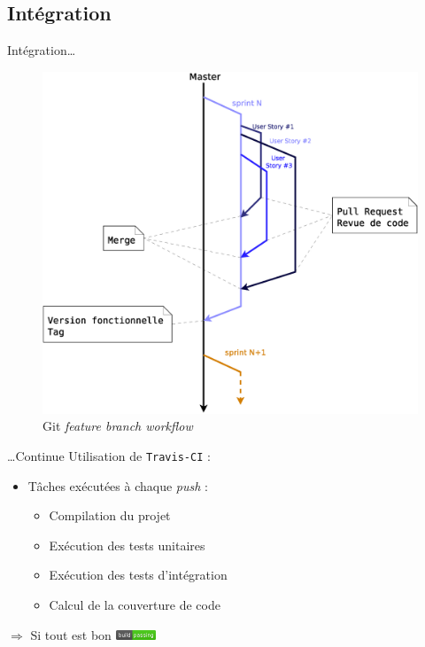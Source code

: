 \AntoineSpeak
\subsection{Intégration}
\begin{frame}{Intégration\ldots}
\begin{figure}
	\centering
	\includegraphics[width=0.83\linewidth]{images/Process/BranchingWorkflow}
	\caption{Git \textit{feature branch workflow}}
	\label{fig:BranchingWorkflow}
\end{figure}
\end{frame}
\begin{frame}{\ldots Continue}	
	\vfill
	Utilisation de \texttt{Travis-CI} : 
\begin{itemize}
	\item Tâches exécutées à chaque \textit{push} :
		\begin{itemize}
			\item Compilation du projet
			\item Exécution des tests unitaires
			\item Exécution des tests d'intégration
			\item Calcul de la couverture de code
		\end{itemize}
\end{itemize}
\vfill
\centering
$\Longrightarrow$ Si tout est bon \includegraphics[width=1.2cm]{images/build}
\end{frame}
\ZacSpeak
